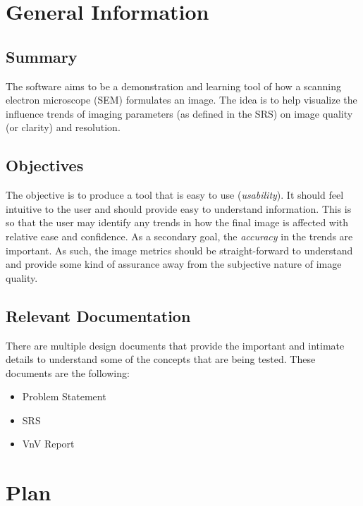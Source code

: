 \documentclass[12pt, titlepage]{article}
\begin{document}
\section{General Information}

\subsection{Summary}

The \progname{} software aims to be a demonstration and learning tool of how a scanning electron 
microscope (SEM) formulates an image. The idea is to help visualize the influence trends of imaging 
parameters (as defined in the SRS) on image quality (or clarity) and resolution.


\subsection{Objectives} \label{sec_objectives}

The objective is to produce a tool that is easy to use (\textit{usability}). It should feel intuitive 
to the user and should provide easy to understand information. This is so that the user may 
identify any trends in how the final image is affected with relative ease and confidence. As a 
secondary goal, the \textit{accuracy} in the trends are important. As such, the image metrics 
should be straight-forward to understand and provide some kind of assurance away from the 
subjective nature of image quality.

\subsection{Relevant Documentation}

There are multiple design documents that provide the important and intimate details to understand 
some of the concepts that are being tested. These documents are the following:

\begin{itemize}
  \item Problem Statement \citep{Prob_Statement}
  \item SRS \citep{SRS}
  \item VnV Report \citep{VnV_report}
\end{itemize}

\section{Plan}
\end{document}
